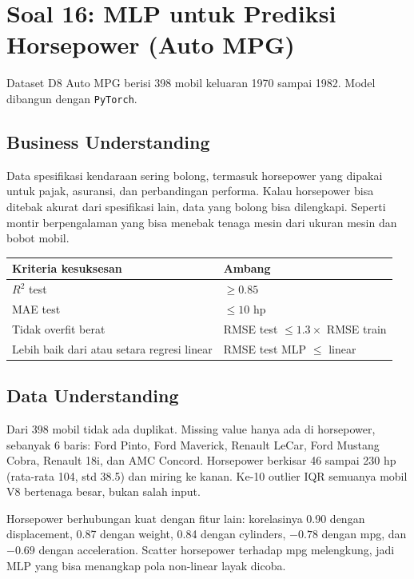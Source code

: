 \newpage
\section{Soal 16: MLP untuk Prediksi Horsepower (Auto MPG)}

Dataset D8 Auto MPG berisi 398 mobil keluaran 1970 sampai 1982. Model dibangun dengan \texttt{PyTorch}.

\subsection{Business Understanding}
Data spesifikasi kendaraan sering bolong, termasuk horsepower yang dipakai untuk pajak, asuransi, dan perbandingan performa. Kalau horsepower bisa ditebak akurat dari spesifikasi lain, data yang bolong bisa dilengkapi. Seperti montir berpengalaman yang bisa menebak tenaga mesin dari ukuran mesin dan bobot mobil.

\begin{tabularx}{\textwidth}{@{}LL@{}}
\toprule
\textbf{Kriteria kesuksesan} & \textbf{Ambang} \\
\midrule
$R^2$ test & $\geq 0.85$ \\
MAE test & $\leq 10$ hp \\
Tidak overfit berat & RMSE test $\leq 1.3 \times$ RMSE train \\
Lebih baik dari atau setara regresi linear & RMSE test MLP $\leq$ linear \\
\bottomrule
\end{tabularx}

\subsection{Data Understanding}
Dari 398 mobil tidak ada duplikat. Missing value hanya ada di horsepower, sebanyak 6 baris: Ford Pinto, Ford Maverick, Renault LeCar, Ford Mustang Cobra, Renault 18i, dan AMC Concord. Horsepower berkisar 46 sampai 230 hp (rata-rata 104, std 38.5) dan miring ke kanan. Ke-10 outlier IQR semuanya mobil V8 bertenaga besar, bukan salah input.

Horsepower berhubungan kuat dengan fitur lain: korelasinya 0.90 dengan displacement, 0.87 dengan weight, 0.84 dengan cylinders, $-0.78$ dengan mpg, dan $-0.69$ dengan acceleration. Scatter horsepower terhadap mpg melengkung, jadi MLP yang bisa menangkap pola non-linear layak dicoba.


